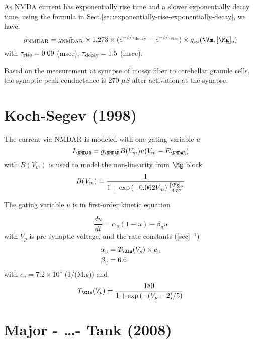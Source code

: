 As NMDA current has exponentially rise time and a slower exponentially decay
time, using the formula in
Sect.\ref{sec:exponentially-rise-exponentially-decay}, we have: 
\begin{equation}
g_\NMDA = \bar{g_\NMDA} \times 1.273 \times (e^{-t/\tau_\decay} - 
   e^{-t/\tau_\rise}) \times g_\infty(\Vm, [\Mg]_o)
\end{equation}
with $\tau_{\text{rise}} = 0.09$ (msec); $\tau_{\text{decay}} = 1.5$ (msec).

Based on the measurement at synapse of mossy fiber to cerebellar granule cells, 
the synaptic peak conductance is 270 $\mu S$ after activation at the synapse.

\section{Koch-Segev (1998)}
\label{sec:NMDAR_Koch-Segev-1998}

The current via NMDAR is modeled with one gating variable $u$
\begin{equation}
I_\NMDAR = \bar{g}_\NMDAR	B(V_m)u(V_m - E_\NMDAR)
\end{equation}
with $B(V_m)$ is used to model the non-linearity from $\Mg$ block
\begin{equation}
B(V_m) = \frac{1}{1 + \exp\left( -0.062 V_m \right)\frac{[\Mg]_o}{3.57}}
\end{equation}

The gating variable $u$ is in first-order kinetic equation

\begin{equation}
\frac{du}{dt} = \alpha_u (1-u) - \beta_u u
\end{equation}
with $V_p$ is pre-synaptic voltage, and the rate constants ([sec]$^{-1}$)
\begin{equation}
\begin{split}
\alpha_u &= T_\Glu(V_p) \times c_u \\
\beta_u &= 6.6
\end{split}
\end{equation} 
with $c_u = 7.2\times 10^4$ (1/(M.s)) and 
\begin{equation*}
T_\Glu(V_p) = \frac{180}{1+\exp\left(-(V_p-2)/5\right)}
\end{equation*}

\section{Major - \ldots - Tank (2008)}
\label{sec:NMDAR-Major-Tank-2008}

